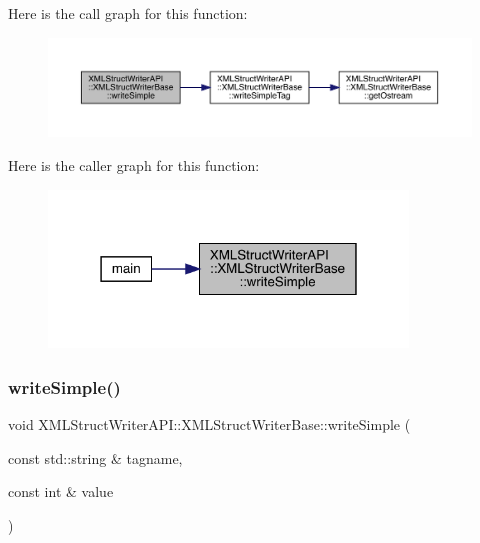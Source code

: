 Here is the call graph for this function\+:
\nopagebreak
\begin{figure}[H]
\begin{center}
\leavevmode
\includegraphics[width=350pt]{db/d4f/classXMLStructWriterAPI_1_1XMLStructWriterBase_a53065b03f0749669f9ed62f6e0875fa4_cgraph}
\end{center}
\end{figure}
Here is the caller graph for this function\+:
\nopagebreak
\begin{figure}[H]
\begin{center}
\leavevmode
\includegraphics[width=271pt]{db/d4f/classXMLStructWriterAPI_1_1XMLStructWriterBase_a53065b03f0749669f9ed62f6e0875fa4_icgraph}
\end{center}
\end{figure}
\mbox{\label{classXMLStructWriterAPI_1_1XMLStructWriterBase_a53065b03f0749669f9ed62f6e0875fa4}} 
\subsubsection{\texorpdfstring{writeSimple()}{writeSimple()}\hspace{0.1cm}{\footnotesize\ttfamily [3/12]}}
{\footnotesize\ttfamily void X\+M\+L\+Struct\+Writer\+A\+P\+I\+::\+X\+M\+L\+Struct\+Writer\+Base\+::write\+Simple (\begin{DoxyParamCaption}\item[{const std\+::string \&}]{tagname,  }\item[{const int \&}]{value }\end{DoxyParamCaption})\hspace{0.3cm}{\ttfamily [inline]}}

